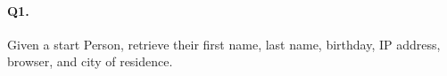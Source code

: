 \paragraph{Q1.}
Given a start Person, retrieve their first name, last name, birthday, IP
address, browser, and city of residence.
